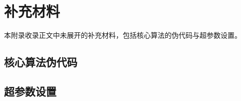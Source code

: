 
\chapter{补充材料}
\label{cha:appendix}

本附录收录正文中未展开的补充材料，包括核心算法的伪代码与超参数设置。

\section{核心算法伪代码}
\label{sec:appendix-algo}


\section{超参数设置}
\label{sec:appendix-hyper}


